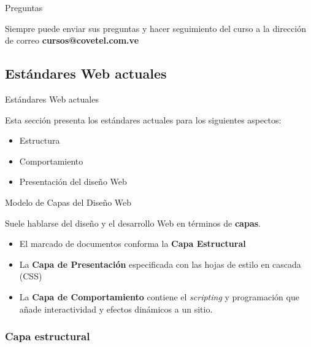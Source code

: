 \documentclass{beamer}
\begin{document}
\begin{frame}{Preguntas} %
    \begin{center}
    Siempre puede enviar sus preguntas y hacer seguimiento del curso a la
    dirección de correo {\bfseries cursos@covetel.com.ve}
    \end{center}
\end{frame}

\subsection{Estándares Web actuales}

\begin{frame}{Estándares Web actuales} %
    \begin{center}
        Esta sección presenta los estándares actuales para los siguientes
        aspectos: 
        \pause
        \begin{itemize}
            \item Estructura
            \item Comportamiento
            \item Presentación del diseño Web
        \end{itemize}
    \end{center}
\end{frame}

\begin{frame}{Modelo de Capas del Diseño Web} %
    \begin{center}
        Suele hablarse del diseño y el desarrollo Web en términos de
        \textbf{capas}.
        \begin{itemize}
            \item El marcado de documentos conforma la {\bfseries Capa
            Estructural}
            \item La {\bfseries Capa de Presentación} especificada con las
            hojas de estilo en cascada (CSS)
            \item La {\bfseries Capa de Comportamiento} contiene el
            \textit{scripting} y programación que añade interactividad y
            efectos dinámicos a un sitio. 
        \end{itemize}
    \end{center}

\end{frame}

\subsubsection{Capa estructural}
\end{document}

